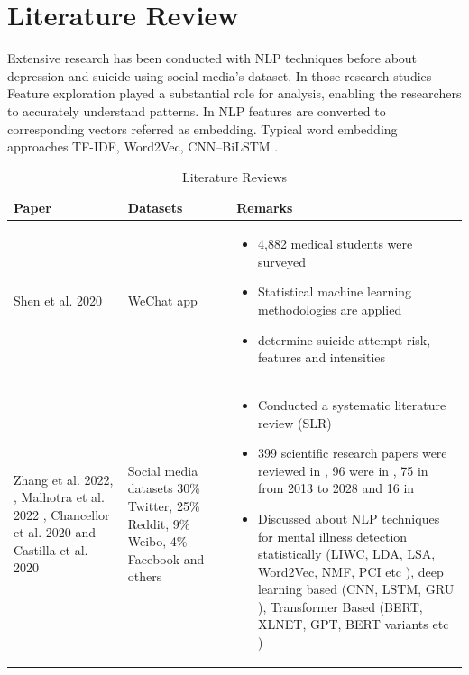 \documentclass[sn-mathphys,Numbered]{sn-jnl}%
\theoremstyle{thmstyleone}%
\theoremstyle{thmstyletwo}%
\theoremstyle{thmstylethree}%
\begin{document}
\section{Literature Review}
\label{lit_rev}
Extensive research has been conducted with NLP techniques before about depression and suicide using social media's dataset. In those research studies Feature exploration played a substantial role for analysis, enabling the researchers to accurately understand patterns. In NLP features are converted to corresponding vectors referred as embedding. Typical word embedding approaches TF-IDF, Word2Vec, CNN–BiLSTM \cite{aldhyani2022detecting, chancellor2020methods, wang2020depression, malhotra2022deep}. 
\begin{table}[h!]
\begin{center}
\begin{flushleft}
\caption{Literature Reviews}\label{chord_inference}%
\begin{tabular}{|p{2cm}|p{2cm}|p{8cm}|}
\toprule
\textbf{Paper} & \textbf{Datasets} & \textbf{Remarks} \\
\midrule
Shen et al. 2020 \cite{shen2020detecting} & 
WeChat app &
\begin{itemize}
\item 4,882 medical students were surveyed
\item Statistical machine learning methodologies are applied
\item determine suicide attempt risk, features and intensities
\end{itemize} 
\\
Zhang et al. 2022, \cite{zhang2022natural}, Malhotra et al. 2022 \cite{malhotra2022deep}, Chancellor et al. 2020 \cite{chancellor2020methods} and Castilla et al. 2020 \cite{castillo2020suicide}  & Social media datasets
30\% Twitter, 25\% Reddit, 9\% Weibo, 4\% Facebook and others
&
\begin{itemize}
\item Conducted a systematic literature review (SLR)
\item 399 scientific research papers were reviewed in  \cite{zhang2022natural}, 96 were in \cite{malhotra2022deep}, 75 in \cite{chancellor2020methods} from 2013 to 2028 and 16 in  \cite{castillo2020suicide} 
\item Discussed about NLP techniques for mental illness detection statistically (LIWC, LDA, LSA, Word2Vec, NMF, PCI etc \cite{zhang2022natural, castillo2020suicide, tadesse2019detection, pennebaker2001linguistic}), deep learning based (CNN, LSTM, GRU \cite{zhang2022natural}), Transformer Based (BERT, XLNET, GPT, BERT variants etc \cite{zhang2022natural})

\end{itemize}
\end{tabular}
\end{flushleft}
\end{center}
\end{table}
\end{document}
